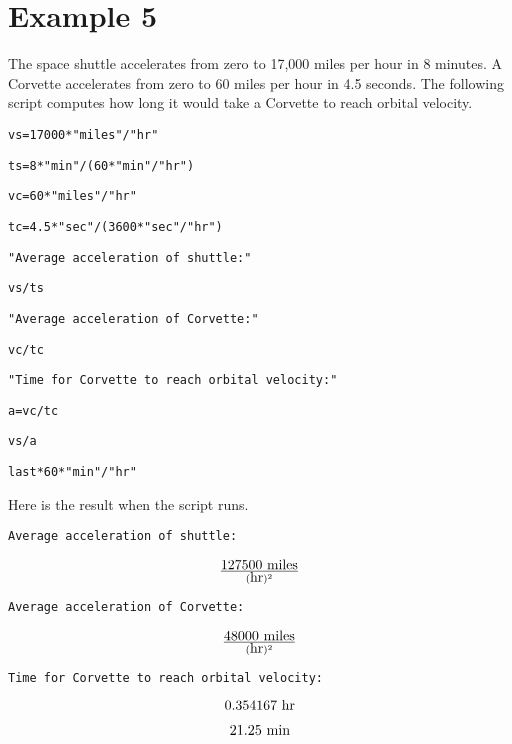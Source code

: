 
\newpage

\section*{Example 5}

The space shuttle accelerates from zero to 17{,}000 miles per hour
in 8 minutes.
A Corvette accelerates from zero to 60 miles per hour in 4.5 seconds.
The following script computes how long it would take a Corvette to
reach orbital velocity.

\medskip
\verb$vs=17000*"miles"/"hr"$

\verb$ts=8*"min"/(60*"min"/"hr")$

\verb$vc=60*"miles"/"hr"$

\verb$tc=4.5*"sec"/(3600*"sec"/"hr")$

\verb$"Average acceleration of shuttle:"$

\verb$vs/ts$

\verb$"Average acceleration of Corvette:"$

\verb$vc/tc$

\verb$"Time for Corvette to reach orbital velocity:"$

\verb$a=vc/tc$

\verb$vs/a$

\verb$last*60*"min"/"hr"$

\medskip
\noindent
Here is the result when the script runs.

\medskip
\verb$Average acceleration of shuttle:$

$$\hbox{127500 miles}\over(\hbox{hr})^2$$

\verb$Average acceleration of Corvette:$

$$\hbox{48000 miles}\over(\hbox{hr})^2$$

\verb$Time for Corvette to reach orbital velocity:$

$$\hbox{0.354167 hr}$$

$$\hbox{21.25 min}$$

